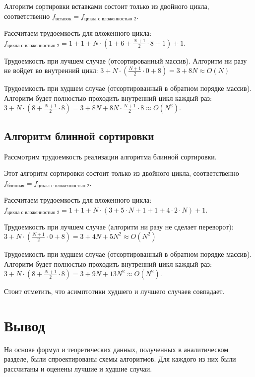Алгоритм сортировки вставками состоит только из двойного цикла, соответственно
$f_{\text{вставок}} = f_{\text{цикла с вложенностью 2}}$.

Рассчитаем трудоемкость для вложенного цикла:
$f_{\text{цикла с вложенностью 2}} = 1 + 1 + N \cdot 
(1 + 6 + \frac{N + 1}{2} \cdot 8 + 1) + 1$.

Трудоемкость при лучшем случае (отсортированный массив). Алгоритм ни разу не войдет 
во внутренний цикл:
$3 + N \cdot 
(\frac{N + 1}{2} \cdot 0 + 8) = 3 + 8N \approx O(N)$

Трудоемкость при худшем случае (отсортированный в обратном порядке массив).
Алгоритм будет полностью проходить внутренний цикл каждый раз:
$3 + N \cdot 
(8 + \frac{N + 1}{2} \cdot 8) = 3 + 8N + 8N \cdot \frac{N + 1}{2} \cdot 8 \approx O(N^2)$.


\subsection{Алгоритм блинной сортировки}

Рассмотрим трудоемкость реализации алгоритма блинной сортировки.

Этот алгоритм сортировки состоит только из двойного цикла, соответственно
$f_{\text{блинная}} = f_{\text{цикла с вложенностью 2}}$.

Рассчитаем трудоемкость для вложенного цикла:
$f_{\text{цикла с вложенностью 2}} = 1 + 1 + N \cdot 
(3 + 5 \cdot N + 1 + 1 + 4 \cdot 2 \cdot N) + 1$.

Трудоемкость при лучшем случае (алгоритм ни разу не сделает переворот):
$3 + N \cdot 
(\frac{N + 1}{2} \cdot 0 + 8) = 3 + 4N + 5N^2 \approx O(N^2)$

Трудоемкость при худшем случае (отсортированный в обратном порядке массив).
Алгоритм будет полностью проходить внутренний цикл каждый раз:
$3 + N \cdot 
(8 + \frac{N + 1}{2} \cdot 8) = 3 + 9N + 13N^2 \approx O(N^2)$.

Стоит отметить, что асимптотики худшего и лучшего случаев совпадает.

\section*{Вывод}

На основе формул и теоретических данных, полученных в аналитическом разделе, были спроектированы схемы алгоритмов.
Для каждого из них были рассчитаны и оценены лучшие и худшие случаи.
